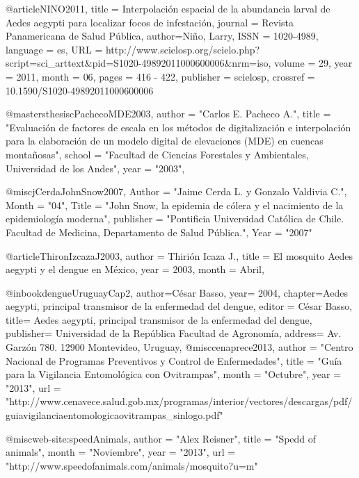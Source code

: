 @article{NINO2011,
   title = {Interpolación espacial de la abundancia larval de Aedes aegypti para localizar focos de infestación},
   journal = {Revista Panamericana de Salud Pública},
   author={Niño, Larry},
   ISSN = {1020-4989},
   language = {es},
   URL = {http://www.scielosp.org/scielo.php?script=sci_arttext&pid=S1020-49892011000600006&nrm=iso},
   volume = {29},
   year = {2011},
   month = {06},
   pages = {416 - 422},
   publisher = {scielosp},
   crossref = {10.1590/S1020-49892011000600006}
}

@mastersthesis{cPachecoMDE2003,
    author    = "Carlos E. Pacheco A.",
    title     = "Evaluación de factores de escala en los métodos de digitalización e interpolación para la elaboración de un modelo digital de elevaciones (MDE) en cuencas montañosas",
    school    = "Facultad de Ciencias Forestales y Ambientales, Universidad de los Andes",
    year      = "2003",
}

@misc{jCerdaJohnSnow2007,
    Author = "Jaime Cerda L. y Gonzalo Valdivia C.",
    Month = "04",
    Title = "John Snow, la epidemia de cólera y el nacimiento de la epidemiología moderna",
    publisher = "Pontificia Universidad Católica de Chile. Facultad de Medicina, Departamento de Salud Pública.",
    Year = "2007"
}


@article{ThironIzcazaJ2003,
    author = {Thirión Icaza J.},
    title = {El mosquito Aedes aegypti y el dengue en México},
    year = {2003},
    month = {Abril},
}

@inbook{dengueUruguayCap2,
  author={César Basso},
  year= 2004, 
  chapter={Aedes aegypti, principal transmisor de la enfermedad del dengue}, 
  editor = {César Basso}, 
  title= {Aedes aegypti, principal transmisor de la enfermedad del dengue}, 
  publisher= {Universidad de la República Facultad de Agronomía},
  address= {Av. Garzón 780. 12900 Montevideo, Uruguay}, 
}
@misc{cenaprece2013,
      author = "Centro Nacional de Programas Preventivos y Control de Enfermedades",
      title = "Guía para la Vigilancia Entomológica con Ovitrampas",
      month = "Octubre",
      year = "2013",
      url = "http://www.cenavece.salud.gob.mx/programas/interior/vectores/descargas/pdf/guiavigilanciaentomologicaovitrampas_sinlogo.pdf"
}

@misc{web-site:speedAnimals,
      author = "Alex Reisner",
      title = "Spedd of animals",
      month = "Noviembre",
      year = "2013",
      url = "http://www.speedofanimals.com/animals/mosquito?u=m"
}

